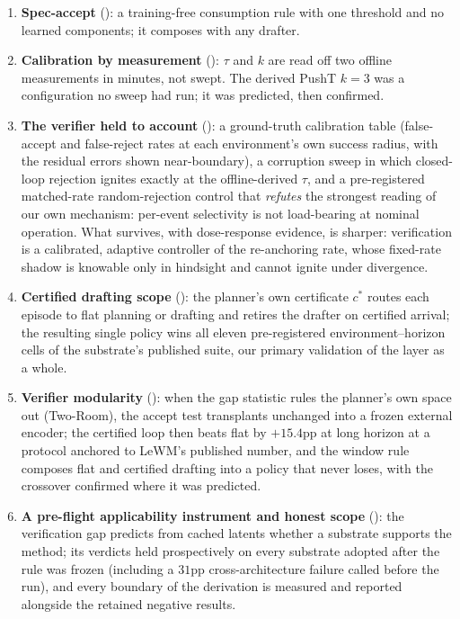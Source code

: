 \documentclass{article}
\begin{document}
\begin{enumerate}[itemsep=2pt,topsep=2pt]
\item \textbf{Spec-accept} (): a training-free consumption
rule with one threshold and no learned components; it composes with any drafter.
\item \textbf{Calibration by measurement} (): $\tau$ and $k$ are
read off two offline measurements in minutes, not swept. The derived PushT $k{=}3$
was a configuration no sweep had run; it was predicted, then confirmed.
\item \textbf{The verifier held to account} (): a
ground-truth calibration table (false-accept and false-reject rates at each
environment's own success radius, with the residual errors shown near-boundary), a
corruption sweep in which closed-loop rejection ignites exactly at the
offline-derived $\tau$, and a pre-registered matched-rate random-rejection control
that \emph{refutes} the strongest reading of our own mechanism: per-event
selectivity is not load-bearing at nominal operation. What survives, with
dose-response evidence, is sharper: verification is a calibrated, adaptive
controller of the re-anchoring rate, whose fixed-rate shadow is knowable only in
hindsight and cannot ignite under divergence.
\item \textbf{Certified drafting scope}
(): the planner's own certificate
$c^{*}$ routes each episode to flat planning or drafting and retires the drafter on
certified arrival; the resulting single policy wins all eleven pre-registered
environment--horizon cells of the substrate's published suite, our primary
validation of the layer as a whole.
\item \textbf{Verifier modularity} (): when the gap
statistic rules the planner's own space out (Two-Room), the accept test transplants
unchanged into a frozen external encoder; the certified loop then beats flat by
$+15.4$pp at long horizon at a protocol anchored to LeWM's published number, and the
window rule composes flat and certified drafting into a policy that never loses,
with the crossover confirmed where it was predicted.
\item \textbf{A pre-flight applicability instrument and honest scope}
(): the verification gap predicts from cached
latents whether a substrate supports the method; its verdicts held prospectively on
every substrate adopted after the rule was frozen (including a $31$pp
cross-architecture failure called before the run), and every boundary of the
derivation is measured and reported alongside the retained negative results.
\end{enumerate}
\end{document}
